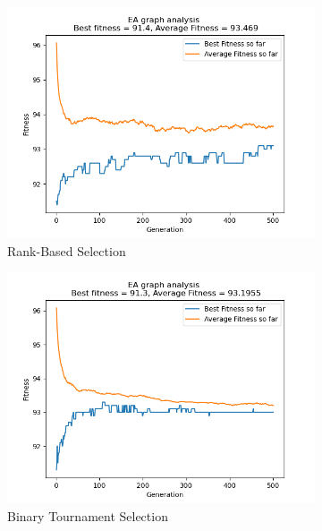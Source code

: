 \documentclass[conference,compsoc]{IEEEtran}
\begin{document}
\begin{figure}[h!]\ContinuedFloat
  \centering
  \begin{subfigure}{0.34\textwidth}
    \includegraphics[width=\linewidth]{../Results/_100_RBS_Truncation_200_100_500.png}
    \caption{Rank-Based Selection}
  \end{subfigure}
  \begin{subfigure}{0.34\textwidth}
    \includegraphics[width=\linewidth]{../Results/_100_BT_Truncation_200_100_500.png}
    \caption{Binary Tournament Selection}
  \end{subfigure}
  \begin{subfigure}{0.34\textwidth}

\end{subfigure}
\end{figure}
\end{document}
